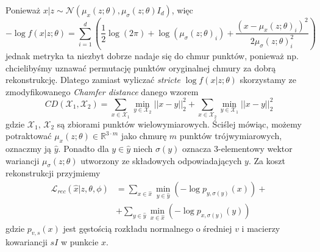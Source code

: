 \documentclass{iithesis}
\begin{document}
Ponieważ $x|z \sim \mathcal{N}(\mu_x(z; \theta), \mu_\sigma(z;\theta)I_d)$, więc
$$
-\log f(x|z;\theta)=\sum_{i=1}^d \left( \frac{1}{2}\log(2\pi) +\log(\mu_\sigma(z;\theta)_i)
+\frac{(x-\mu_x(z;\theta)_i)^2}{2\mu_\sigma(z;\theta)_i^2} \right)
$$
jednak metryka ta niezbyt dobrze nadaje się do chmur punktów, ponieważ np.
chcielibyśmy uznawać permutację punktów oryginalnej chmury za dobrą rekonstrukcję.
Dlatego zamiast wyliczać \textit{stricte} $\log f(x|z;\theta)$ skorzystamy ze zmodyfikowanego
\textit{Chamfer distance} danego wzorem
\begin{equation}
CD(\mathcal{X}_1,\mathcal{X}_2) = \sum_{x \in \mathcal{X}_1} \min_{y \in \mathcal{X}_2} ||x-y||_2^2
+ \sum_{x \in \mathcal{X}_2} \min_{y \in \mathcal{X}_1} ||x-y||_2^2
\label{eq:chamfer_distance}
\end{equation}
gdzie $\mathcal{X}_1,\,\mathcal{X}_2$ są zbiorami punktów wielowymiarowych.
Ściślej mówiąc, możemy potraktować $\mu_x(z;\theta) \in \mathbb{R}^{3 \cdotp m}$ jako chmurę
$m$ punktów trójwymiarowych, oznaczmy ją $\hat{y}$. Ponadto dla $y \in \hat{y}$ niech
$\sigma(y)$ oznacza 3-elementowy wektor wariancji $\mu_\sigma(z;\theta)$ utworzony ze
składowych odpowiadających $y$. Za koszt rekonstrukcji przyjmiemy
\begin{equation}
\begin{split}
\mathcal{L}_{rec}(\hat{x}|z,\theta,\phi) &= \sum_{x \in \hat{x}} \min_{y \in \hat{y}}
\left( -\log p_{y,\sigma(y)}(x) \right) +\\
&+ \sum_{y \in \hat{y}} \min_{x \in \hat{x}} \left( -\log p_{x,\sigma(y)}(y) \right)
\end{split}
\end{equation}
gdzie $p_{v,s}(x)$ jest gęstością rozkładu normalnego o średniej $v$ i macierzy kowariancji
$sI$ w punkcie $x$.
\end{document}

